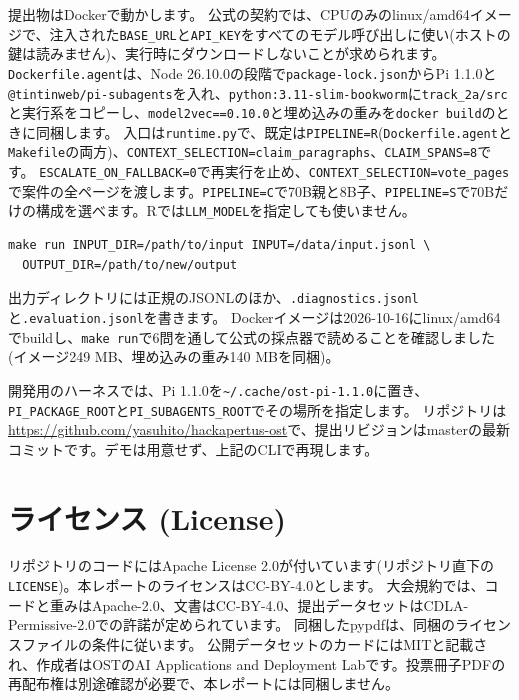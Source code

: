 \documentclass[10pt,a4paper]{ltjsarticle}
\begin{document}
提出物はDockerで動かします。
公式の契約\cite{apiguide}では、CPUのみのlinux/amd64イメージで、注入された\texttt{BASE\_URL}と\texttt{API\_KEY}をすべてのモデル呼び出しに使い(ホストの鍵は読みません)、実行時にダウンロードしないことが求められます。
\texttt{Dockerfile.agent}は、Node 26.10.0の段階で\texttt{package-lock.json}からPi 1.1.0と\texttt{@tintinweb/pi-subagents}を入れ、\texttt{python:3.11-slim-bookworm}に\texttt{track\_2a/src}と実行系をコピーし、\texttt{model2vec==0.10.0}と埋め込みの重みを\texttt{docker build}のときに同梱します。
入口は\texttt{runtime.py}で、既定は\texttt{PIPELINE=R}(\texttt{Dockerfile.agent}と\texttt{Makefile}の両方)、\texttt{CONTEXT\_SELECTION=claim\_paragraphs}、\texttt{CLAIM\_SPANS=8}です。
\texttt{ESCALATE\_ON\_FALLBACK=0}で再実行を止め、\texttt{CONTEXT\_SELECTION=vote\_pages}で案件の全ページを渡します。\texttt{PIPELINE=C}で70B親と8B子、\texttt{PIPELINE=S}で70Bだけの構成を選べます。Rでは\texttt{LLM\_MODEL}を指定しても使いません。
\begin{verbatim}
make run INPUT_DIR=/path/to/input INPUT=/data/input.jsonl \
  OUTPUT_DIR=/path/to/new/output
\end{verbatim}
出力ディレクトリには正規のJSONLのほか、\texttt{.diagnostics.jsonl}と\texttt{.evaluation.jsonl}を書きます。
Dockerイメージは2026-10-16にlinux/amd64でbuildし、\texttt{make run}で6問を通して公式の採点器で読めることを確認しました(イメージ249 MB、埋め込みの重み140 MBを同梱)。

開発用のハーネスでは、Pi 1.1.0を\texttt{\textasciitilde/.cache/ost-pi-1.1.0}に置き、\texttt{PI\_PACKAGE\_ROOT}と\texttt{PI\_SUBAGENTS\_ROOT}でその場所を指定します。
リポジトリは\url{https://github.com/yasuhito/hackapertus-ost}で、提出リビジョンはmasterの最新コミットです。デモは用意せず、上記のCLIで再現します。

\section*{ライセンス (License)}

リポジトリのコードにはApache License 2.0が付いています(リポジトリ直下の\texttt{LICENSE})。本レポートのライセンスはCC-BY-4.0とします。
大会規約では、コードと重みはApache-2.0、文書はCC-BY-4.0、提出データセットはCDLA-Permissive-2.0での許諾が定められています。
同梱したpypdfは、同梱のライセンスファイルの条件に従います。
公開データセット\cite{dataset}のカードにはMITと記載され、作成者はOSTのAI Applications and Deployment Labです。投票冊子PDFの再配布権は別途確認が必要で、本レポートには同梱しません。

\begingroup
\small


\endgroup
\end{document}
